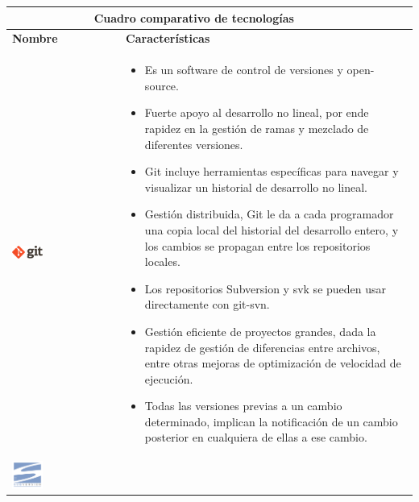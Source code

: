 \newpage
\begin{table}[b!]
    \centering
    \vspace{-30mm}
      \begin{tabular}{|p{2cm}|ll}
        \hline
        \multicolumn{2}{|c|}{{\bf Cuadro comparativo de tecnologías}} \\ 
        \hline
          \multicolumn{1}{|p{4cm}|}{{\bf Nombre}} & 
		  \multicolumn{1}{p{10cm}|}{{\bf Características}}\\
        \hline
          \multicolumn{1}{|p{5cm}|}{\includegraphics[width=0.3\textwidth]{images/git}} & 
          \multicolumn{2}{p{10cm}|}{\begin{itemize}
          \vspace{-17mm}
        \item Es un software de control de versiones y open-source.
        \item Fuerte apoyo al desarrollo no lineal, por ende rapidez en la gestión de ramas y mezclado de diferentes versiones. 
        \item Git incluye herramientas específicas para navegar y visualizar un historial de desarrollo no lineal.
        \item Gestión distribuida, Git le da a cada programador una copia local del historial del desarrollo entero, y los cambios se propagan entre los repositorios locales.
         \item Los repositorios Subversion y svk se pueden usar directamente con git-svn.
        \item Gestión eficiente de proyectos grandes, dada la rapidez de gestión de diferencias entre archivos, entre otras mejoras de optimización de velocidad de ejecución.
        \item Todas las versiones previas a un cambio determinado, implican la notificación de un cambio posterior en cualquiera de ellas a ese cambio.\cite{38}
      \end{itemize}} \\
        \hline
          \multicolumn{1}{|p{5cm}|}{\includegraphics[width=0.3\textwidth]{images/subversion}} & 

\end{tabular}
\end{table}
